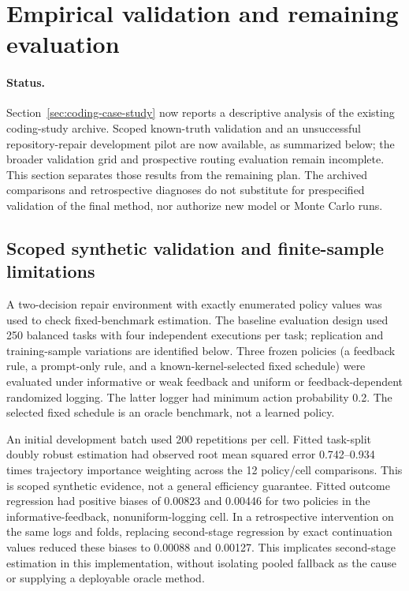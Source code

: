 \section{Empirical validation and remaining evaluation}
\label{sec:empirical-plan}

\paragraph{Status.}
Section~\ref{sec:coding-case-study} now reports a descriptive analysis of the existing coding-study archive.
Scoped known-truth validation and an unsuccessful repository-repair development pilot are now available,
as summarized below; the broader validation grid and prospective routing evaluation remain incomplete. This section separates those results from the remaining plan. The archived comparisons and retrospective diagnoses do not substitute
for prespecified validation of the final method, nor authorize new model or Monte Carlo runs.

\subsection{Scoped synthetic validation and finite-sample limitations}
A two-decision repair environment with exactly enumerated policy values was used to check fixed-benchmark
estimation. The baseline evaluation design used 250 balanced tasks with four independent executions per task;
replication and training-sample variations are identified below. Three frozen
policies (a feedback rule, a prompt-only rule, and a known-kernel-selected fixed schedule) were evaluated
under informative or weak feedback and uniform or feedback-dependent randomized logging. The latter logger
had minimum action probability 0.2. The selected fixed schedule is an oracle benchmark, not a learned policy.

An initial development batch used 200 repetitions per cell. Fitted task-split doubly robust estimation had
observed root mean squared error 0.742--0.934 times trajectory importance weighting across the 12 policy/cell
comparisons. This is scoped synthetic evidence, not a general efficiency guarantee. Fitted outcome regression
had positive biases of 0.00823 and 0.00446 for two policies in the informative-feedback, nonuniform-logging
cell. In a retrospective intervention on the same logs and folds, replacing second-stage regression by exact
continuation values reduced these biases to 0.00088 and 0.00127. This implicates second-stage estimation in
this implementation, without isolating pooled fallback as the cause or supplying a deployable oracle method.

